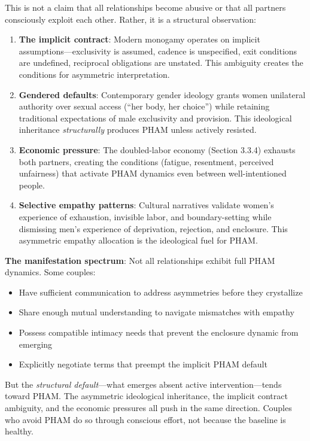 \documentclass[12pt,openany]{book}
\numberwithin{equation}{chapter}
\begin{document}
This is not a claim that all relationships become abusive or that all partners consciously exploit each other. Rather, it is a structural observation:

\begin{enumerate}
    \item \textbf{The implicit contract}: Modern monogamy operates on implicit assumptions---exclusivity is assumed, cadence is unspecified, exit conditions are undefined, reciprocal obligations are unstated. This ambiguity creates the conditions for asymmetric interpretation.
    
    \item \textbf{Gendered defaults}: Contemporary gender ideology grants women unilateral authority over sexual access (``her body, her choice'') while retaining traditional expectations of male exclusivity and provision. This ideological inheritance \textit{structurally} produces PHAM unless actively resisted.
    
    \item \textbf{Economic pressure}: The doubled-labor economy (Section 3.3.4) exhausts both partners, creating the conditions (fatigue, resentment, perceived unfairness) that activate PHAM dynamics even between well-intentioned people.
    
    \item \textbf{Selective empathy patterns}: Cultural narratives validate women's experience of exhaustion, invisible labor, and boundary-setting while dismissing men's experience of deprivation, rejection, and enclosure. This asymmetric empathy allocation is the ideological fuel for PHAM.
\end{enumerate}

\textbf{The manifestation spectrum}: Not all relationships exhibit full PHAM dynamics. Some couples:
\begin{itemize}
    \item Have sufficient communication to address asymmetries before they crystallize
    \item Share enough mutual understanding to navigate mismatches with empathy
    \item Possess compatible intimacy needs that prevent the enclosure dynamic from emerging
    \item Explicitly negotiate terms that preempt the implicit PHAM default
\end{itemize}

But the \textit{structural default}---what emerges absent active intervention---tends toward PHAM. The asymmetric ideological inheritance, the implicit contract ambiguity, and the economic pressures all push in the same direction. Couples who avoid PHAM do so through conscious effort, not because the baseline is healthy.
\end{document}
